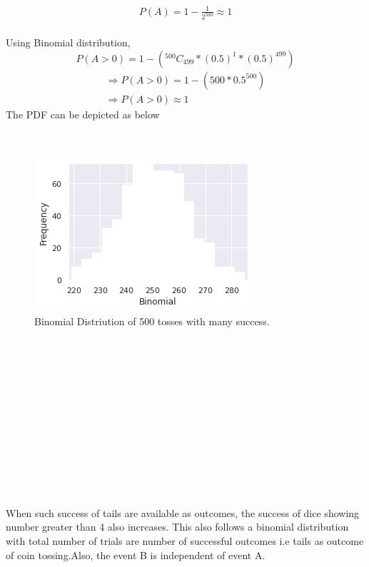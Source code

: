 \documentclass[journal,12pt,twocolumn]{IEEEtran}
\begin{document}
\begin{align*}
P(A)=1-\frac{1}{2^{500}}\approx 1
\end{align*}
\\Using Binomial distribution,
\begin{equation}
P(A > 0)=1-( { }^{500}C_{499}*(0.5)^{1}*(0.5)^{499})
\end{equation}
\begin{align*}
\Rightarrow P(A > 0) = 1-(500 * 0.5^{500})\\
\Rightarrow P(A > 0) \approx 1
\end{align*}
The PDF can be depicted as below\\
\\
\\
\begin{figure}
	\includegraphics[width=\linewidth]{Binomial_500_success.png}
  \caption{Binomial Distriution of 500 tosses with many success.}
  \label{fig:Fig2}
\end{figure}
\\
\\
\\
\\
\\
\\
\\
\\
\\
\\
\\
\\When such success of tails are available as outcomes, the success of dice showing number greater than 4 also increases. This also follows a binomial distribution with total number of trials are number of successful outcomes i.e tails as outcome of coin tossing.Also, the event B is independent of event A.\\
\end{document}
